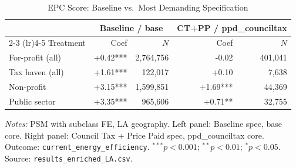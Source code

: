 \begin{table}[htbp]
\centering
\caption{EPC Score: Baseline vs.\ Most Demanding Specification}
\label{tab:h1_attenuation_all}
\begin{tabular}{lrrrr}
\toprule
 & \multicolumn{2}{c}{Baseline / base} & \multicolumn{2}{c}{CT+PP / ppd\_counciltax} \\
\cmidrule(lr){2-3} \cmidrule(lr){4-5}
Treatment & Coef & $N$ & Coef & $N$ \\
\midrule
For-profit (all) & +0.42*** & 2,764,756 & -0.02 & 401,041 \\
Tax haven (all) & +1.61*** & 122,017 & +0.10 & 7,638 \\
Non-profit & +3.15*** & 1,599,851 & +1.69*** & 44,369 \\
Public sector & +3.35*** & 965,606 & +0.71** & 32,755 \\
\bottomrule
\end{tabular}
\begin{minipage}{0.9\textwidth}
\vspace{4pt}
\footnotesize
\textit{Notes:} PSM with subclass FE, LA geography.
Left panel: Baseline spec, base core. Right panel: Council Tax + Price Paid spec, ppd\_counciltax core.
Outcome: \texttt{current\_energy\_efficiency}.
$^{***}p<0.001$; $^{**}p<0.01$; $^{*}p<0.05$.
Source: \texttt{results\_enriched\_LA.csv}.
\end{minipage}
\end{table}
